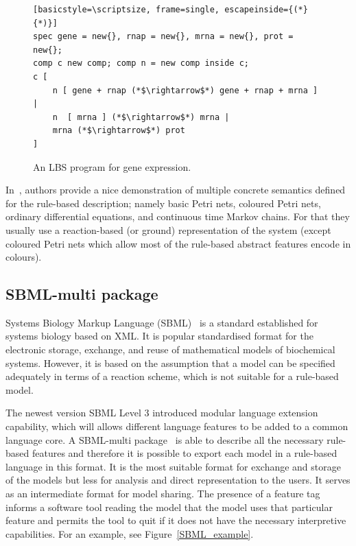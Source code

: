 \documentclass[11pt,a4paper]{report}
\begin{document}
\begin{figure}[!h]
\lstset{language=LBS}
\begin{lstlisting}[basicstyle=\scriptsize, frame=single, escapeinside={(*}{*)}]
spec gene = new{}, rnap = new{}, mrna = new{}, prot = new{}; 
comp c new comp; comp n = new comp inside c;
c [ 
	n [ gene + rnap (*$\rightarrow$*) gene + rnap + mrna ] | 
	n  [ mrna ] (*$\rightarrow$*) mrna | 
	mrna (*$\rightarrow$*) prot
]
\end{lstlisting}
\caption{An LBS program for gene expression.}\label{LBS_example}
\end{figure}

In~\cite{Pedersen}, authors provide a nice demonstration of multiple concrete semantics defined for the rule-based description; namely basic Petri nets, coloured Petri nets, ordinary differential equations, and continuous time Markov chains. For that they usually use a reaction-based (or ground) representation of the system (except coloured Petri nets which allow most of the rule-based abstract features encode in colours).

\subsection{SBML-multi package}

Systems Biology Markup Language (SBML)~\cite{hucka2003systems} is a standard established for systems biology based on XML. It is popular standardised format for the electronic storage, exchange, and reuse of mathematical models of biochemical systems. However, it is based on the assumption that a model can be specified adequately in terms of a reaction scheme, which is not suitable for a rule-based model.

The newest version SBML Level 3 introduced modular language extension capability, which will allows different language features to be added to a common language core. A SBML-multi package~\cite{SBMLmulti} is able to describe all the necessary rule-based features and therefore it is possible to export each model in a rule-based language in this format. It is the most suitable format for exchange and storage of the models but less for analysis and direct representation to the users. It serves as an intermediate format for model sharing. The presence of a feature tag informs a software tool reading the model that the model uses that particular feature and permits the tool to quit if it does not have the necessary interpretive capabilities. For an example, see Figure~\ref{SBML_example}.
\end{document}
